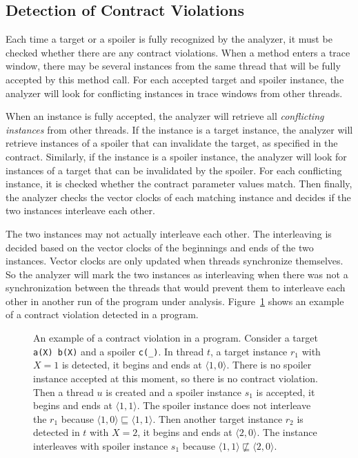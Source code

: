 \subsection{Detection of Contract Violations}
\label{violations}

Each time a target or a spoiler is fully recognized by the analyzer, it must be
checked whether there are any contract violations. When a method enters a trace
window, there may be several instances from the same thread that will be fully
accepted by this method call. For each accepted target and spoiler instance, the
analyzer will look for conflicting instances in trace windows from other
threads.

When an instance is fully accepted, the analyzer will retrieve all
\emph{conflicting instances} from other threads. If the instance is a target
instance, the analyzer will retrieve instances of a spoiler that can invalidate
the target, as specified in the contract. Similarly, if the instance is a
spoiler instance, the analyzer will look for instances of a target that can be
invalidated by the spoiler. For each conflicting instance, it is checked whether
the contract parameter values match. Then finally, the analyzer checks the
vector clocks of each matching instance and decides if the two instances
interleave each other.

The two instances may not actually interleave each other. The interleaving is
decided based on the vector clocks of the beginnings and ends of the two
instances. Vector clocks are only updated when threads synchronize themselves.
So the analyzer will mark the two instances as interleaving when there was not
a synchronization between the threads that would prevent them to interleave each
other in another run of the program under analysis.
Figure~\ref{detectionExample} shows an example of a contract violation detected
in a program.

\begin{figure}[hbt]
    \begin{center}
        \label{detectionExample}
        
        \caption{An example of a contract violation in a program. Consider a
        target \texttt{a(X) b(X)} and a spoiler \texttt{c(\_)}. In thread $t$, a
        target instance $r_1$ with $X=1$ is detected, it begins and ends at
        $\langle 1,0 \rangle$. There is no spoiler instance accepted at this
        moment, so there is no contract violation. Then a thread $u$ is created
        and a spoiler instance $s_1$ is accepted, it begins and ends at $\langle
        1,1 \rangle$. The spoiler instance does not interleave the $r_1$ because
        $\langle 1,0 \rangle \sqsubseteq \langle 1,1 \rangle$.  Then another
        target instance $r_2$ is detected in $t$ with $X=2$, it begins and ends
        at $\langle 2,0 \rangle$. The instance interleaves with spoiler instance
        $s_1$ because $\langle 1,1 \rangle \nsqsubseteq \langle 2,0 \rangle$.}
    \end{center}
\end{figure}

